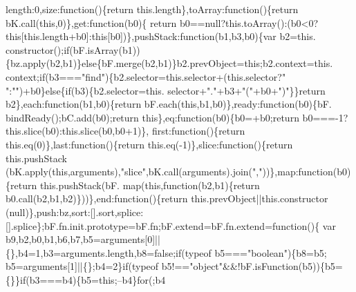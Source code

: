 \begin{DoxyCode}
      length:0,size:\textcolor{keyword}{function}()\{\textcolor{keywordflow}{return} this.length\},toArray:\textcolor{keyword}{function}()\{\textcolor{keywordflow}{return} bK.call(\textcolor{keyword}{this},0)\},\textcolor{keyword}{get}:\textcolor{keyword}{function}(b0)\{\textcolor{keywordflow}{
      return} b0==null?this.toArray():(b0<0?\textcolor{keyword}{this}[this.length+b0]:\textcolor{keyword}{this}[b0])\},pushStack:\textcolor{keyword}{function}(b1,b3,b0)\{var b2=this.
      constructor();\textcolor{keywordflow}{if}(bF.isArray(b1))\{bz.apply(b2,b1)\}\textcolor{keywordflow}{else}\{bF.merge(b2,b1)\}b2.prevObject=\textcolor{keyword}{this};b2.context=this.
      context;\textcolor{keywordflow}{if}(b3===\textcolor{stringliteral}{"find"})\{b2.selector=this.selector+(this.selector?\textcolor{stringliteral}{" "}:\textcolor{stringliteral}{""})+b0\}\textcolor{keywordflow}{else}\{\textcolor{keywordflow}{if}(b3)\{b2.selector=this.
      selector+\textcolor{stringliteral}{"."}+b3+\textcolor{stringliteral}{"("}+b0+\textcolor{stringliteral}{")"}\}\}\textcolor{keywordflow}{return} b2\},each:\textcolor{keyword}{function}(b1,b0)\{\textcolor{keywordflow}{return} bF.each(\textcolor{keyword}{this},b1,b0)\},ready:\textcolor{keyword}{function}(b0)\{bF.
      bindReady();bC.add(b0);\textcolor{keywordflow}{return} \textcolor{keyword}{this}\},eq:\textcolor{keyword}{function}(b0)\{b0=+b0;\textcolor{keywordflow}{return} b0===-1?this.slice(b0):this.slice(b0,b0+1)\},
      first:\textcolor{keyword}{function}()\{\textcolor{keywordflow}{return} this.eq(0)\},last:\textcolor{keyword}{function}()\{\textcolor{keywordflow}{return} this.eq(-1)\},slice:\textcolor{keyword}{function}()\{\textcolor{keywordflow}{return} this.pushStack
      (bK.apply(\textcolor{keyword}{this},arguments),\textcolor{stringliteral}{"slice"},bK.call(arguments).join(\textcolor{stringliteral}{","}))\},map:\textcolor{keyword}{function}(b0)\{\textcolor{keywordflow}{return} this.pushStack(bF.
      map(\textcolor{keyword}{this},\textcolor{keyword}{function}(b2,b1)\{return b0.call(b2,b1,b2)\}))\},end:\textcolor{keyword}{function}()\{\textcolor{keywordflow}{return} this.prevObject||this.constructor
      (null)\},push:bz,sort:[].sort,splice:[].splice\};bF.fn.init.prototype=bF.fn;bF.extend=bF.fn.extend=\textcolor{keyword}{function}()\{
      var b9,b2,b0,b1,b6,b7,b5=arguments[0]||\{\},b4=1,b3=arguments.length,b8=\textcolor{keyword}{false};\textcolor{keywordflow}{if}(typeof b5===\textcolor{stringliteral}{"boolean"})\{b8=b5;
      b5=arguments[1]||\{\};b4=2\}\textcolor{keywordflow}{if}(typeof b5!==\textcolor{stringliteral}{"object"}&&!bF.isFunction(b5))\{b5=\{\}\}\textcolor{keywordflow}{if}(b3===b4)\{b5=\textcolor{keyword}{this};--b4\}\textcolor{keywordflow}{for}(;b4

\end{DoxyCode}
